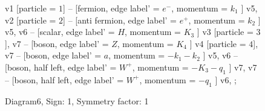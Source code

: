 \documentclass{revtex4}
\begin{document}
\begin{figure}[!htb]
\begin{center}
{    %
v1 [particle = \(1\)] -- [fermion, edge label' = \(e^{-}\), momentum = \(k_{1}\) ] v5, 
v2 [particle = \(2\)] -- [anti fermion, edge label' = \(e^{+}\), momentum = \(k_{2}\) ] v5, 
v6 -- [scalar, edge label' = \(H\), momentum = \(K_{3}\) ] v3 [particle = \(3\)], 
v7 -- [boson, edge label' = \(Z\), momentum = \(K_{4}\) ] v4 [particle = \(4\)], 
v7 -- [boson, edge label' = \(a\), momentum = \(-k_{1} - k_{2}\) ] v5, 
v6 -- [boson, half left, edge label' = \(W^{+}\), momentum = \(-K_{3} - q_{1}\) ] v7, 
v7 -- [boson, half left, edge label' = \(W^{+}\), momentum = \(-q_{1}\) ] v6, 
};
\end{center}
\caption{Diagram6, Sign: 1, Symmetry factor: 1}
\end{figure}
\newpage
\end{document}
